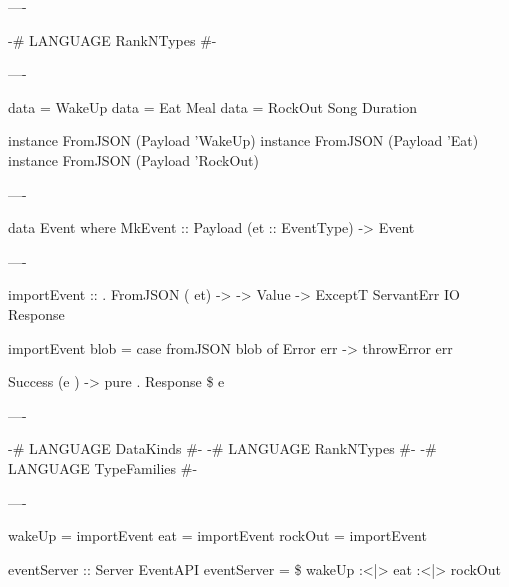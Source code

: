 ----

\begin{raw}
  {-# LANGUAGE RankNTypes   #-}
\end{raw}

----

\begin{raw}
  data   = WakeUp
  data      = Eat Meal
  data  = RockOut Song Duration

  instance FromJSON (Payload 'WakeUp)
  instance FromJSON (Payload 'Eat)
  instance FromJSON (Payload 'RockOut)
\end{raw}

----

\begin{hs}
  data Event where
    MkEvent :: Payload (et :: EventType) -> Event
\end{hs}

----

\begin{raw}
  importEvent :: 
               . FromJSON ( et)
              -> 
              -> Value
              -> ExceptT ServantErr IO Response

  importEvent \note{_} blob =
    case fromJSON blob of
      Error err ->
        throwError err

      Success (e ) ->
        pure . Response \$  e
\end{raw}

----

\begin{raw}
  {-# LANGUAGE DataKinds           #-}
  {-# LANGUAGE RankNTypes          #-}
  {-# LANGUAGE TypeFamilies        #-}
\end{raw}


----

\begin{raw}
  wakeUp  = importEvent 
  eat     = importEvent 
  rockOut = importEvent 

  eventServer :: Server EventAPI
  eventServer =  \$
    wakeUp :<|> eat :<|> rockOut
\end{raw}

